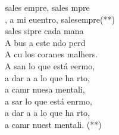 \begin{cancion}%
	 sales empre, sales mpre\\
	, a mi euentro, salesempre(**)\\
	sales sipre cada mana\\
	A bus a este ndo perd\\
	A cu los coranes malhers.\\
	A san lo que está eermo,\\
	a dar a a lo que ha rto,\\
	a camr nuesa mentali,\\
	a sar lo que está enrmo,\\
	a dar a a lo que ha rto,\\
	a camr nuest mentali. (**)\\
\end{cancion}%
